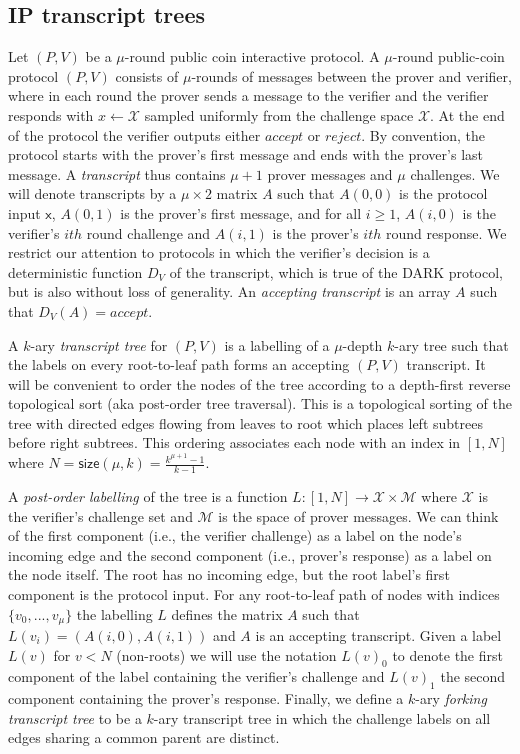 \subsection{IP transcript trees}\label{sec:IPtrees}

Let $(P,V)$ be a $\mu$-round public coin interactive protocol. A $\mu$-round public-coin protocol $(P,V)$ consists of $\mu$-rounds of messages between the prover and verifier, where in each round the prover sends a message to the verifier and the verifier responds with $x \leftarrow \mathcal{X}$ sampled uniformly from the challenge space $\mathcal{X}$. At the end of the protocol the verifier outputs either $accept$ or $reject$. By convention, the protocol starts with the prover's first message and ends with the prover's last message. A \emph{transcript} thus contains $\mu+1$ prover messages and $\mu$ challenges. We will denote transcripts by a $\mu \times 2$ matrix $A$ such that $A(0,0)$ is the protocol input $\mathsf{x}$, $A(0, 1)$ is the prover's first message, and for all $i ≥ 1$, $A(i, 0)$ is the verifier's $ith$ round challenge and $A(i,1)$ is the prover's $ith$ round response.  We restrict our attention to protocols in which the verifier's decision is a deterministic function $D_V$ of the transcript, which is true of the DARK protocol, but is also without loss of generality. An \emph{accepting transcript} is an array $A$ such that $D_V(A) = accept$. 

A $k$-ary \emph{transcript tree} for $(P,V)$ is a labelling of a $\mu$-depth $k$-ary tree such that the labels on every root-to-leaf path forms an accepting $(P,V)$ transcript.  It will be convenient to order the nodes of the tree according to a depth-first reverse topological sort (aka post-order tree traversal). This is a topological sorting of the tree with directed edges flowing from leaves to root which places left subtrees before right subtrees. This ordering associates each node with an index in $[1,N]$ where $N = \textsf{size}(\mu, k) = \frac{k^{\mu+1} - 1}{k-1}$. 

A \emph{post-order labelling} of the tree is a function $L:[1,N] \rightarrow \mathcal{X} \times \mathcal{M}$ where $\mathcal{X}$ is the verifier's challenge set and $\mathcal{M}$ is the space of prover messages. We can think of the first component (i.e., the verifier challenge) as a label on the node's incoming edge and the second component (i.e., prover's response) as a label on the node itself. The root has no incoming edge, but the root label's first component is the protocol input. For any root-to-leaf path of nodes with indices $\{v_0,...,v_\mu\}$ the labelling $L$ defines the matrix $A$ such that $L(v_i) = (A(i, 0), A(i, 1))$ and $A$ is an accepting transcript. Given a label $L(v)$ for $v < N$ (non-roots) we will use the notation $L(v)_0$ to denote the first component of the label containing the verifier's challenge and $L(v)_1$ the second component containing the prover's response. Finally, we define a $k$-ary \emph{forking transcript tree} to be a $k$-ary transcript tree in which the challenge labels on all edges sharing a common parent are distinct.


